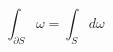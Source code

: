 \documentclass[20pt]{article}
\begin{document}
	\begin{equation}
		\int_{\partial S} \omega =\int_{S} d \omega
	\end{equation}
	\begin{verbatim}

	\end{verbatim}
\end{document}
